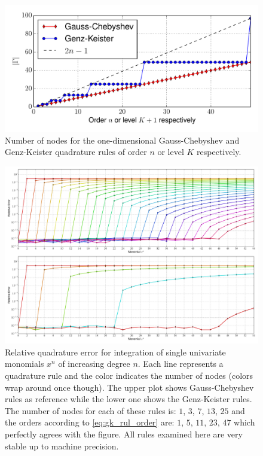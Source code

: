 \documentclass[a4paper,10pt]{article}
\begin{document}
\begin{figure}
  \centering
  \includegraphics[width=\linewidth]{./img/number_nodes_chebyshevt.pdf}
  \caption{Number of nodes for the one-dimensional Gauss-Chebyshev and Genz-Keister quadrature
  rules of order $n$ or level $K$ respectively.}
  \label{fig:number_nodes_chebyshevt}
\end{figure}

\begin{figure}
  \centering
  \includegraphics[width=\linewidth]{./img/monomial_errors_chebyshevt.pdf}
  \caption{Relative quadrature error for integration of single univariate monomials $x^n$ of increasing degree $n$.
  Each line represents a quadrature rule and the color indicates the number of nodes (colors wrap around once though).
  The upper plot shows Gauss-Chebyshev rules as reference while the lower one shows the Genz-Keister rules.
  The number of nodes for each of these rules is:
  $1$, $3$,  $7$, $13$, $25$ and the orders according to \eqref{eq:gk_rul_order} are:
  $1$, $5$, $11$, $23$, $47$ which perfectly agrees with the figure.
  All rules examined here are very stable up to machine precision.}
  \label{fig:monomial_errors_chebyshevt}
\end{figure}
\end{document}

